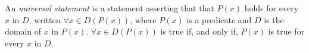 \guard





\begin{defn}
\label{defn:universalStatement}
	An \emph{universal statement} is a statement asserting that that $P(x)$ holds for every $x$ in $D$, written $\forall x\in D(P(x))$, where  $P(x)$ is a predicate and $D$ is the domain of $x$ in $P(x)$.
	$\forall x\in D(P(x))$ is true if, and only if, $P(x)$ is true for every $x$ in $D$.
\end{defn}

